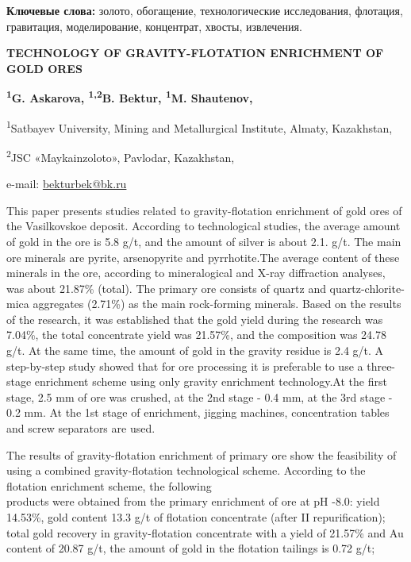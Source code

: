 {\bfseries Ключевые слова:} золото, обогащение, технологические
исследования, флотация, гравитация, моделирование, концентрат, хвосты,
извлечения.
\begin{articleheader}

{\bfseries TECHNOLOGY OF GRAVITY-FLOTATION ENRICHMENT OF GOLD ORES}

{\bfseries \textsuperscript{1}G. Askarova, \textsuperscript{1,2}B.
Bektur\textsuperscript{\envelope }, \textsuperscript{1}M. Shautenov,
}
\end{articleheader}

\begin{affiliation}

\textsuperscript{1}Satbayev University, Mining and Metallurgical
Institute, Almaty, Kazakhstan,

\textsuperscript{2}JSC «Maykainzoloto», Pavlodar, Kazakhstan,

e-mail: \href{mailto:bekturbek@bk.run}{bekturbek@bk.ru}
\end{affiliation}

This paper presents studies related to gravity-flotation enrichment of
gold ores of the Vasilkovskoe deposit. According to technological
studies, the average amount of gold in the ore is 5.8 g/t, and the
amount of silver is about 2.1. g/t. The main ore minerals are pyrite,
arsenopyrite and pyrrhotite.The average content of these minerals in the
ore, according to mineralogical and X-ray diffraction analyses, was
about 21.87\% (total). The primary ore consists of quartz and
quartz-chlorite-mica aggregates (2.71\%) as the main rock-forming
minerals. Based on the results of the research, it was established that
the gold yield during the research was 7.04\%, the total concentrate
yield was 21.57\%, and the composition was 24.78 g/t. At the same time,
the amount of gold in the gravity residue is 2.4 g/t. A step-by-step
study showed that for ore processing it is preferable to use a
three-stage enrichment scheme using only gravity enrichment
technology.At the first stage, 2.5 mm of ore was crushed, at the 2nd
stage - 0.4 mm, at the 3rd stage - 0.2 mm. At the 1st stage of
enrichment, jigging machines, concentration tables and screw separators
are used.

The results of gravity-flotation enrichment of primary ore show the
feasibility of using a combined gravity-flotation technological scheme.
According to the flotation enrichment scheme, the following \\products
were obtained from the primary enrichment of ore at pH -8.0: yield
14.53\%, gold content 13.3 g/t of flotation concentrate (after II
repurification); total gold recovery in gravity-flotation concentrate
with a yield of 21.57\% and Au content of 20.87 g/t, the amount of gold
in the flotation tailings is 0.72 g/t;

